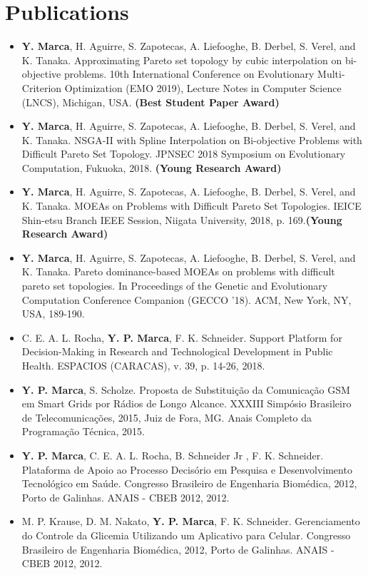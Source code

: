 \documentclass[letterpaper,11pt]{article}
\newcommand{\resumeItemAlt}[2]{
	\vspace{-2pt}
	\item\small{
		\textbf{#1}{#2 \vspace{-2pt}}
	}
}
\newcommand{\resumeItemListStart}{\begin{itemize} }
\newcommand{\resumeItemListEnd}{\end{itemize}\vspace{-5pt}}
\begin{document}
\section{Publications}
\resumeItemListStart
	\resumeItemAlt{}
	{\textbf{Y. Marca}, H. Aguirre, S. Zapotecas, A. Liefooghe, B. Derbel, S. Verel, and K. Tanaka. Approximating Pareto set topology by cubic interpolation on bi-objective problems. 10th International Conference on Evolutionary Multi-Criterion Optimization (EMO 2019), Lecture Notes in Computer Science (LNCS), Michigan, USA. \textbf{(Best Student Paper Award)}}	
	\resumeItemAlt{}
	{\textbf{Y. Marca}, H. Aguirre, S. Zapotecas, A. Liefooghe, B. Derbel, S. Verel, and K. Tanaka. NSGA-II with Spline Interpolation on Bi-objective Problems with Difficult Pareto Set Topology. JPNSEC 2018 Symposium on Evolutionary Computation, Fukuoka, 2018. \textbf{(Young Research Award)}}
	\resumeItemAlt{}
	{\textbf{Y. Marca}, H. Aguirre, S. Zapotecas, A. Liefooghe, B. Derbel, S. Verel, and K. Tanaka. MOEAs on Problems with Difficult Pareto Set Topologies. IEICE Shin-etsu Branch IEEE Session, Niigata University, 2018, p. 169.\textbf{(Young Research Award)}}
	\resumeItemAlt{}
	{\textbf{Y. Marca}, H. Aguirre, S. Zapotecas, A. Liefooghe, B. Derbel, S. Verel, and K. Tanaka. Pareto dominance-based MOEAs on problems with difficult pareto set topologies. In Proceedings of the Genetic and Evolutionary Computation Conference Companion (GECCO '18). ACM, New York, NY, USA, 189-190.}
	\resumeItemAlt{}
	{C. E. A. L. Rocha, \textbf{Y. P. Marca}, F. K. Schneider. Support Platform for Decision-Making in Research and Technological Development in Public Health. ESPACIOS (CARACAS), v. 39, p. 14-26, 2018.}

	\resumeItemAlt{}
	{\textbf{Y. P. Marca}, S. Scholze. Proposta de Substituição da Comunicação GSM em Smart Grids por Rádios de Longo Alcance. XXXIII Simpósio Brasileiro de Telecomunicações, 2015, Juiz de Fora, MG. Anais Completo da Programação Técnica, 2015.}

	\resumeItemAlt{}
	{\textbf{Y. P. Marca}, C. E. A. L. Rocha, B. Schneider Jr , F. K. Schneider. Plataforma de Apoio ao Processo Decisório em Pesquisa e Desenvolvimento Tecnológico em Saúde. Congresso Brasileiro de Engenharia Biomédica, 2012, Porto de Galinhas. ANAIS - CBEB 2012, 2012.}
	\resumeItemAlt{}
	{M. P. Krause, D. M. Nakato, \textbf{Y. P. Marca}, F. K. Schneider. Gerenciamento do Controle da Glicemia Utilizando um Aplicativo para Celular. Congresso Brasileiro de Engenharia Biomédica, 2012, Porto de Galinhas. ANAIS - CBEB 2012, 2012.}
	
\resumeItemListEnd


\end{document}
